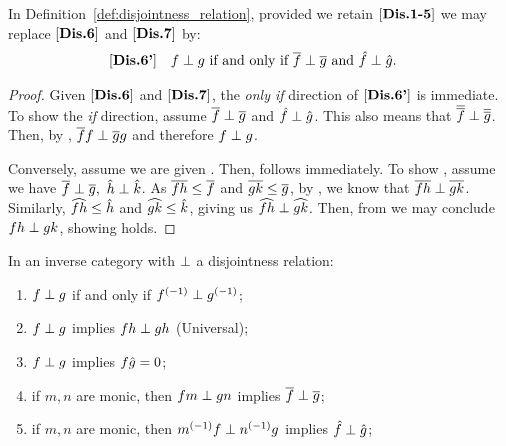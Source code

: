 \begin{lemma}\label{lem:disjointness_equivalent_axioms}
  In Definition~\ref{def:disjointness_relation}, provided we retain $[\text{\bfseries {Dis}.{1-5}}]$ we may
  replace $[\text{\bfseries {Dis}.{6}}]$ and $[\text{\bfseries {Dis}.{7}}]$ by:
  \begin{align*}
    [\text{\bfseries {Dis}.{6'}}]\quad &f\perp g\text{ if and only if }\overline{f} \perp \overline{g}
      \text{ and }\hat{f}\perp\hat{g}.
  \end{align*}
\end{lemma}
\begin{proof}
  Given $[\text{\bfseries {Dis}.{6}}]$ and $[\text{\bfseries {Dis}.{7}}]$, the \emph{only if} direction of $[\text{\bfseries {Dis}.{6'}}]$ is
  immediate. To show the \emph{if} direction, assume $\overline{f} \perp \overline{g}$ and
  $\hat{f}\perp\hat{g}$. This also means that $\overline{\overline{f}} \perp \overline{\overline{g}}$. Then, by
  , $\overline{f} f \perp \overline{g}g$ and therefore $f \perp g$.

  Conversely, assume we are given . Then,  follows immediately. To show
  , assume we have $\rst{f}\cdperp \rst{g},\ \rg{h}\cdperp \rg{k}$. As
  $\overline{f h} \le \overline{f}$ and $\overline{g k}\le\overline{g}$, by , we know that
  $\overline{f h} \perp \overline{g k}$. Similarly, $\widehat{f h} \le \hat{h}$ and $\widehat{g k} \le \hat{k}$,
  giving us $\widehat{f h}\perp \widehat{g k}$. Then, from  we may conclude
  $f h \perp g k$, showing  holds.
\end{proof}
\begin{lemma}\label{lem:disjointness_various}
  In an inverse category \X with $\perp$ a disjointness relation:
  \begin{enumerate}[{(}i{)}]
    \item $f \perp g$ if and only if ${f}^{(-1)}\perp {g}^{(-1)}$; \label{lemitem:djv_inverses}
    \item $f \perp g$ implies $f h \perp g h$ (Universal);\label{lemitem:djv_universal}
    \item $f \perp g$ implies $f\hat{g} = 0$;
    \item if $m,n$ are monic, then $f m \perp g n$ implies $\overline{f} \perp \overline{g}$;
    \item if $m,n$ are monic, then ${m}^{(-1)} f \perp {n}^{(-1)}g$ implies $\hat{f} \perp \hat{g}$;
  \end{enumerate}
\end{lemma}
